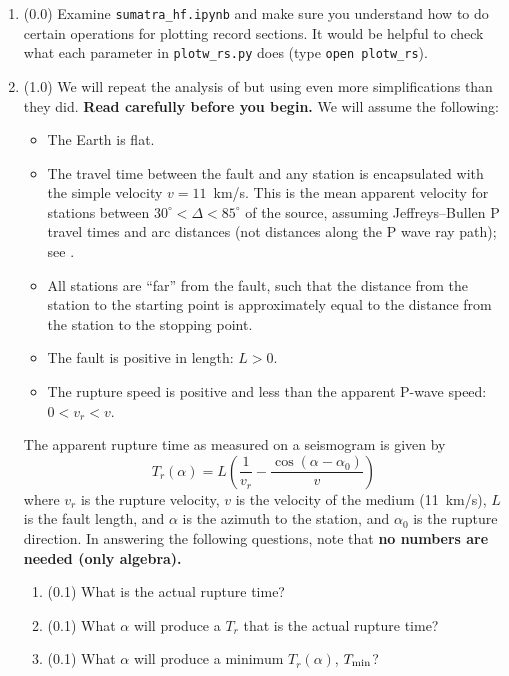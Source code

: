 \documentclass[11pt,titlepage,fleqn]{article}
\begin{document}
\begin{enumerate}
\item (0.0) Examine \verb+sumatra_hf.ipynb+ and make sure you understand how to do certain operations for plotting record sections. It would be helpful to check what each parameter in \verb+plotw_rs.py+ does (type \verb+open plotw_rs+).

\item (1.0) We will repeat the analysis of \citet{Ni2005} but using even more simplifications than they did. {\bf Read \citet{Ni2005} carefully before you begin.} We will assume the following:
%
\begin{itemize}
\item The Earth is flat.
\item The travel time between the fault and any station is encapsulated with the simple velocity $v = 11$~km/s. This is the mean apparent velocity for stations between $30^\circ < \Delta < 85^\circ$ of the source, assuming Jeffreys--Bullen P travel times and arc distances (not distances along the P wave ray path); see .
\item All stations are ``far'' from the fault, such that the distance from the station to the starting point is approximately equal to the distance from the station to the stopping point.
\item The fault is positive in length: $L > 0$.
\item The rupture speed is positive and less than the apparent P-wave speed: $0 < v_r < v$.
\end{itemize}
%
The apparent rupture time as measured on a seismogram is given by \citep[][Section 4.3.2]{SteinWysession}
%
\begin{equation}
T_r(\alpha) = L\left(\frac{1}{v_r} - \frac{\cos(\alpha-\alpha_0)}{v}\right)
\label{Tr}
\end{equation}
%
where $v_r$ is the rupture velocity, $v$ is the velocity of the medium (11~km/s), $L$ is the fault length, and $\alpha$ is the azimuth to the station, and $\alpha_0$ is the rupture direction. In answering the following questions, note that {\bf no numbers are needed (only algebra).}
%
\begin{enumerate}
\item (0.1) What is the actual rupture time?
\item (0.1) What $\alpha$ will produce a $T_r$ that is the actual rupture time?
\item (0.1) What $\alpha$ will produce a minimum $T_r(\alpha)$, $T_{\rm min}$?

\end{enumerate}
\end{enumerate}
\end{document}
